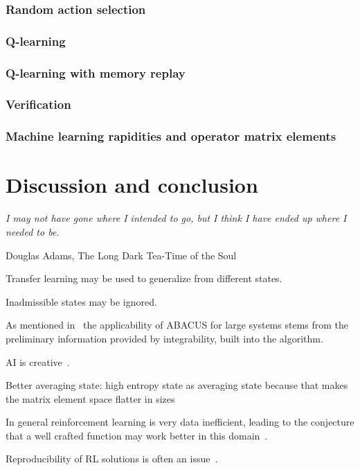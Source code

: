 \documentclass[11pt, a4paper]{report} %
\begin{document}
\subsection{Random action selection}

\subsection{Q-learning}

\subsection{Q-learning with memory replay}

\subsection{Verification}


\subsection{Machine learning rapidities and operator matrix elements}

\chapter{Discussion and conclusion}\label{chap:conclusion}

\epigraph{\textit{I may not have gone where I intended to go, but I think I have ended up where I needed to be.}}{Douglas Adams, The Long Dark Tea-Time of the Soul}


Transfer learning may be used to generalize from different states.

Inadmissible states may be ignored.

As mentioned in~\cite{Caux2009} the applicability of ABACUS for large systems stems from the preliminary information provided by integrability, built into the algorithm.

AI is creative~\cite{1803.03453}.

Better averaging state: high entropy state as averaging state because that makes the matrix element space flatter in sizes

In general reinforcement learning is very data inefficient, leading to the conjecture that a well crafted function may work better in this domain~\cite{1710.02298}.

Reproducibility of RL solutions is often an issue~\cite{1709.06560}.
\end{document}
